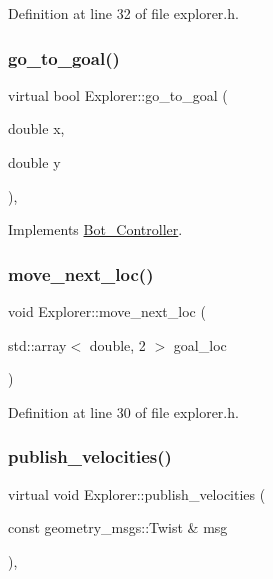 Definition at line 32 of file explorer.\+h.

\mbox{\label{class_explorer_aaf31add48ee079244fbdc7aaa574c72b}} 
\subsubsection{\texorpdfstring{go\+\_\+to\+\_\+goal()}{go\_to\_goal()}}
{\footnotesize\ttfamily virtual bool Explorer\+::go\+\_\+to\+\_\+goal (\begin{DoxyParamCaption}\item[{double}]{x,  }\item[{double}]{y }\end{DoxyParamCaption})\hspace{0.3cm}{\ttfamily [override]}, {\ttfamily [virtual]}}



Implements \hyperlink{class_bot___controller_a5e2f980d71dab69d952c532b5819483b}{Bot\+\_\+\+Controller}.

\mbox{\label{class_explorer_a2b0c1e46e1a17e99f4156edf5a93b691}} 
\subsubsection{\texorpdfstring{move\+\_\+next\+\_\+loc()}{move\_next\_loc()}}
{\footnotesize\ttfamily void Explorer\+::move\+\_\+next\+\_\+loc (\begin{DoxyParamCaption}\item[{std\+::array$<$ double, 2 $>$}]{goal\+\_\+loc }\end{DoxyParamCaption})\hspace{0.3cm}{\ttfamily [inline]}}



Definition at line 30 of file explorer.\+h.

\mbox{\label{class_explorer_a71d49e07fda9132640ef7ca560492065}} 
\subsubsection{\texorpdfstring{publish\+\_\+velocities()}{publish\_velocities()}}
{\footnotesize\ttfamily virtual void Explorer\+::publish\+\_\+velocities (\begin{DoxyParamCaption}\item[{const geometry\+\_\+msgs\+::\+Twist \&}]{msg }\end{DoxyParamCaption})\hspace{0.3cm}{\ttfamily [override]}, {\ttfamily [virtual]}}



